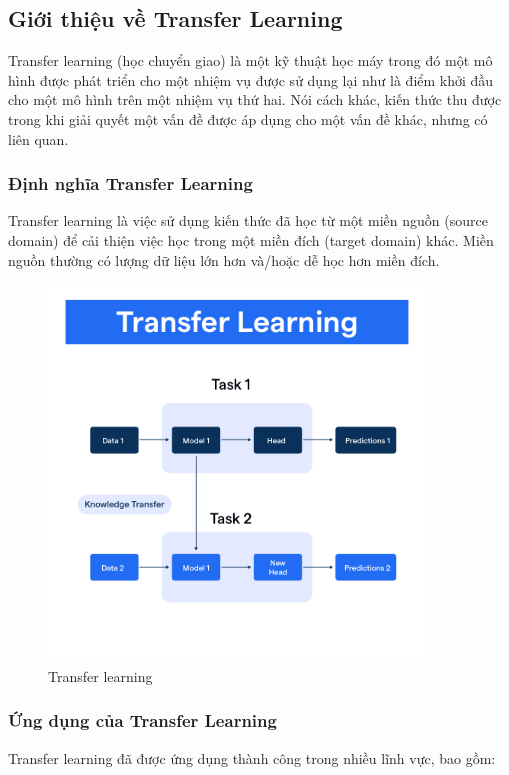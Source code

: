 \subsection{Giới thiệu về Transfer Learning}

Transfer learning (học chuyển giao) là một kỹ thuật học máy trong đó một mô hình được phát triển cho một nhiệm vụ được sử dụng lại như là điểm khởi đầu cho một mô hình trên một nhiệm vụ thứ hai. Nói cách khác, kiến thức thu được trong khi giải quyết một vấn đề được áp dụng cho một vấn đề khác, nhưng có liên quan. 

\subsubsection{Định nghĩa Transfer Learning}

Transfer learning là việc sử dụng kiến thức đã học từ một miền nguồn (source domain) để cải thiện việc học trong một miền đích (target domain) khác. Miền nguồn thường có lượng dữ liệu lớn hơn và/hoặc dễ học hơn miền đích. 

 \begin{figure}[H]
    \centering
    \includegraphics[width=10cm]{Images/Theoretical basis/Transfer_Learning.png}
\caption{Transfer learning}
\end{figure}


\subsubsection{Ứng dụng của Transfer Learning}

Transfer learning đã được ứng dụng thành công trong nhiều lĩnh vực, bao gồm:

